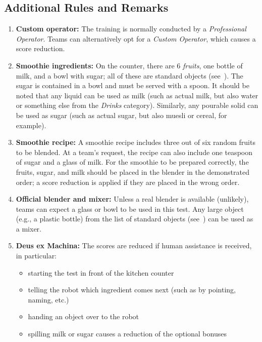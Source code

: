 \subsection*{Additional Rules and Remarks}
\begin{enumerate}
	\item \textbf{Custom operator:} The training is normally conducted by a \emph{Professional Operator}.
	Teams can alternatively opt for a \emph{Custom Operator}, which causes a score reduction.
	\item \textbf{Smoothie ingredients:} On the counter, there are 6 \emph{fruits}, one bottle of milk, and a bowl with sugar; all of these are standard objects (see~).
	The sugar is contained in a bowl and must be served with a spoon.
	It should be noted that any liquid can be used as milk (such as actual milk, but also water or something else from the \emph{Drinks} category).
	Similarly, any pourable solid can be used as sugar (such as actual sugar, but also muesli or cereal, for example).
	\item \textbf{Smoothie recipe:} A smoothie recipe includes three out of six random fruits to be blended.
	At a team's request, the recipe can also include one teaspoon of sugar and a glass of milk.
	For the smoothie to be prepared correctly, the fruits, sugar, and milk should be placed in the blender in the demonstrated order; a score reduction is applied if they are placed in the wrong order.
	\item \textbf{Official blender and mixer:} Unless a real blender is available (unlikely), teams can expect a glass or bowl to be used in this test.
	Any large object (e.g., a plastic bottle) from the list of standard objects (see~) can be used as a mixer.
	\item \textbf{Deus ex Machina:} The scores are reduced if human assistance is received, in particular:
	\begin{itemize}[nosep]
		\item starting the test in front of the kitchen counter
		\item telling the robot which ingredient comes next (such as by pointing, naming, etc.)
		\item handing an object over to the robot
		\item spilling milk or sugar causes a reduction of the optional bonuses
	\end{itemize}
\end{enumerate}


